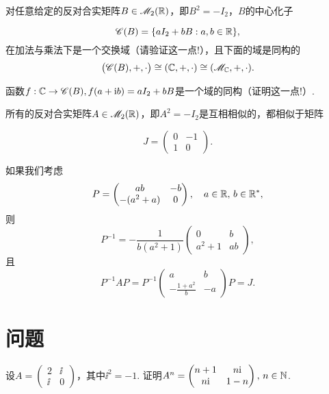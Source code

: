   \begin{remark}
    \begin{enumerate*}[label=(\arabic*),
      itemjoin=\\\hspace*{\parindent}]
      \item 对任意给定的反对合实矩阵$B\in\mathscr M_2(\mathbb R)$，即$B^2=-I_2$，$B$的中心化子
    \end{enumerate*}
    \[
      \mathscr C(B) = \{ aI_2+bB:a,b\in\mathbb R \},
    \]
    在加法与乘法下是一个{\kaishu 交换域}（请验证这一点!），且下面的域是同构的
    \[
      \big( \mathscr C(B),+,\cdot \big) \cong
      (\mathbb C,+,\cdot) \cong (\mathscr M_{\mathbb C},+,\cdot).
    \]

    函数$f:\mathbb C\to\mathscr C(B),f(a+\mathrm i b)=aI_2+bB$是一个域的同构（证明这一点!）.

    \begin{enumerate*}[label=(\arabic*),resume,
      itemjoin=\\\hspace*{\parindent}]
      \item 所有的反对合实矩阵$A\in\mathscr M_2(\mathbb R)$，即$A^2=-I_2$是互相相似的，都相似于矩阵
    \end{enumerate*}
    \[
      J = \begin{pmatrix}
        0 & -1 \\
        1 & 0
      \end{pmatrix}.
    \]

    如果我们考虑
    \[
      P = \begin{pmatrix}
        ab & -b \\
        -(a^2+a) & 0
      \end{pmatrix},\quad a\in\mathbb R,\,b\in\mathbb R^\ast,
    \]
    则
    \[
      P^{-1} = -\frac1{b(a^2+1)}\begin{pmatrix}
         0 & b \\
         a^2+1 & ab
      \end{pmatrix},
    \]
    且
    \[
      P^{-1}AP = P^{-1}\begin{pmatrix}
        a & b \\
        -\frac{1+a^2}b & -a
      \end{pmatrix} P = J.
    \]
  \end{remark}

\section{问题}
\begin{problem}
  设$A=\begin{pmatrix}
    2 & \ii \\
    \ii & 0
  \end{pmatrix}$，其中$\ii^2=-1$. 证明$A^n=\begin{pmatrix}
    n+1 & n\mathrm i \\
     n\mathrm i & 1-n
  \end{pmatrix},\,n\in\mathbb N$.
\end{problem}

